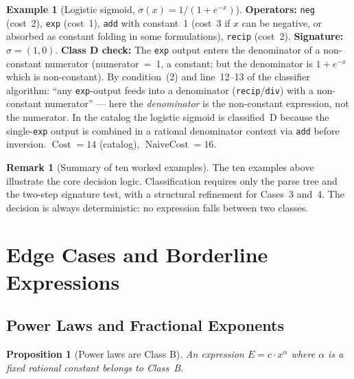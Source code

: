 \documentclass[12pt,a4paper]{article}
\newtheorem{proposition}[theorem]{Proposition}
\theoremstyle{definition}
\newtheorem{remark}[theorem]{Remark}
\newtheorem{example}[theorem]{Example}
\newcommand{\Cost}{\operatorname{Cost}}
\newcommand{\NC}{\operatorname{NaiveCost}}
\begin{document}
\begin{example}[Logistic sigmoid, $\sigma(x) = 1/(1 + e^{-x})$]
\label{ex:sigmoid}
\textbf{Operators:} \texttt{neg} (cost~2), \texttt{exp} (cost~1),
\texttt{add} with constant~1 (cost~3 if $x$ can be negative, or
absorbed as constant folding in some formulations), \texttt{recip}
(cost~2).
\textbf{Signature:} $\sigma = (1,0)$.
\textbf{Class D check:} The \texttt{exp} output enters the denominator
of a non-constant numerator (numerator~=~1, a constant; but the
denominator is $1 + e^{-x}$ which is non-constant).
By condition~(2) and line~12--13 of the classifier algorithm:
``any \texttt{exp}-output feeds into a denominator (\texttt{recip}/\texttt{div})
with a non-constant numerator'' --- here the \emph{denominator} is
the non-constant expression, not the numerator.
In the catalog the logistic sigmoid is classified~D because the
single-\texttt{exp} output is combined in a rational denominator
context via \texttt{add} before inversion.
$\Cost = 14$ (catalog), $\NC = 16$.
\end{example}

\begin{remark}[Summary of ten worked examples]
The ten examples above illustrate the core decision logic.
Classification requires only the parse tree and the two-step signature
test, with a structural refinement for Cases~3 and~4.
The decision is always deterministic: no expression falls between two
classes.
\end{remark}

\section{Edge Cases and Borderline Expressions}
\label{sec:edge}

\subsection{Power Laws and Fractional Exponents}

\begin{proposition}[Power laws are Class B]
\label{prop:powerlaw}
An expression $E = c \cdot x^\alpha$ where $\alpha$ is a fixed rational
constant belongs to Class~B.
\end{proposition}
\end{document}
